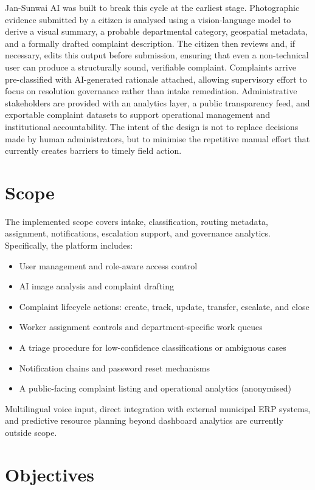 Jan-Sunwai AI was built to break this cycle at the earliest stage. Photographic evidence submitted by a citizen is analysed using a vision-language model to derive a visual summary, a probable departmental category, geospatial metadata, and a formally drafted complaint description. The citizen then reviews and, if necessary, edits this output before submission, ensuring that even a non-technical user can produce a structurally sound, verifiable complaint. Complaints arrive pre-classified with AI-generated rationale attached, allowing supervisory effort to focus on resolution governance rather than intake remediation. Administrative stakeholders are provided with an analytics layer, a public transparency feed, and exportable complaint datasets to support operational management and institutional accountability. The intent of the design is not to replace decisions made by human administrators, but to minimise the repetitive manual effort that currently creates barriers to timely field action.

\section{Scope}

The implemented scope covers intake, classification, routing metadata, assignment, notifications, escalation support, and governance analytics. Specifically, the platform includes:

\begin{itemize}
\item User management and role-aware access control
\item AI image analysis and complaint drafting
\item Complaint lifecycle actions: create, track, update, transfer, escalate, and close
\item Worker assignment controls and department-specific work queues
\item A triage procedure for low-confidence classifications or ambiguous cases
\item Notification chains and password reset mechanisms
\item A public-facing complaint listing and operational analytics (anonymised)
\end{itemize}

Multilingual voice input, direct integration with external municipal ERP systems, and predictive resource planning beyond dashboard analytics are currently outside scope.

\section{Objectives}

